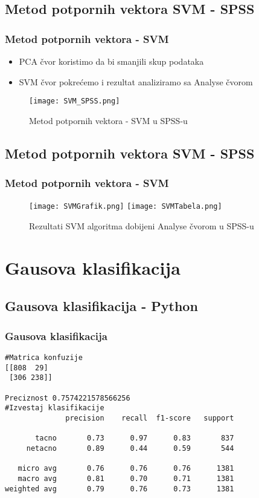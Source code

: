 \documentclass{beamer}
\begin{document}
\subsection*{Metod potpornih vektora SVM - SPSS}
\begin{frame}[fragile]
\frametitle{Metod potpornih vektora - SVM}
\begin{itemize}
	\item PCA čvor koristimo da bi smanjili skup podataka
	\item SVM čvor pokrećemo i rezultat analiziramo sa Analyse čvorom 
\end{itemize}
\begin{figure}
\begin{center}
\texttt{[image: SVM\_SPSS.png]}
\end{center}
\caption{Metod potpornih vektora - SVM u  SPSS-u}
\end{figure}
\end{frame}


\subsection*{Metod potpornih vektora SVM - SPSS}
\begin{frame}[fragile]
\frametitle{Metod potpornih vektora - SVM}

\begin{figure}
\texttt{[image: SVMGrafik.png]}
\texttt{[image: SVMTabela.png]}
\caption{Rezultati SVM algoritma dobijeni Analyse čvorom u SPSS-u}
\end{figure}

\end{frame}

\section{Gausova klasifikacija}
\subsection*{Gausova klasifikacija - Python}
\begin{frame}[fragile]
\frametitle{Gausova klasifikacija}

\begin{lstlisting}
#Matrica konfuzije
[[808  29]
 [306 238]]

Preciznost 0.7574221578566256
#Izvestaj klasifikacije
              precision    recall  f1-score   support

       tacno       0.73      0.97      0.83       837
     netacno       0.89      0.44      0.59       544

   micro avg       0.76      0.76      0.76      1381
   macro avg       0.81      0.70      0.71      1381
weighted avg       0.79      0.76      0.73      1381
\end{lstlisting}
\end{frame}
\end{document}
